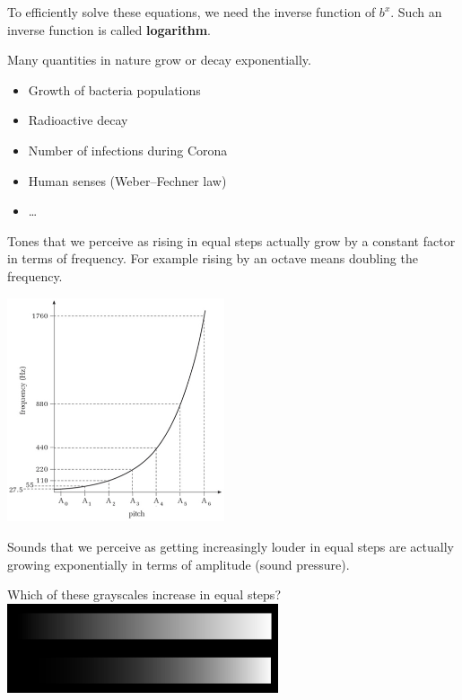 To efficiently solve these equations, we need the inverse function of $b^x$.
Such an inverse function is called \textbf{logarithm}.
\begin{tcolorbox}
	Many quantities in nature grow or decay exponentially.
	\begin{itemize}
		\item Growth of bacteria populations
		\item Radioactive decay
		\item Number of infections during Corona
		\item Human senses (Weber--Fechner law)
		\item \ldots
	\end{itemize}
\end{tcolorbox}
\begin{example}
	Tones that we perceive as rising in equal steps actually grow by a constant factor in terms of frequency.
	For example rising by an octave means doubling the frequency.
	\begin{flushright}
	\includegraphics[width=0.48\textwidth]{images/octave}
	\end{flushright}
\end{example}
\begin{example}
	Sounds that we perceive as getting increasingly louder in equal steps are actually growing exponentially in terms of amplitude (sound pressure).
	\begin{flushright}
	\end{flushright}
\end{example}
\begin{example}
	Which of these grayscales increase in equal steps?\\[10pt]
	\includegraphics[width=0.60\textwidth]{images/grayscale}
\end{example}
